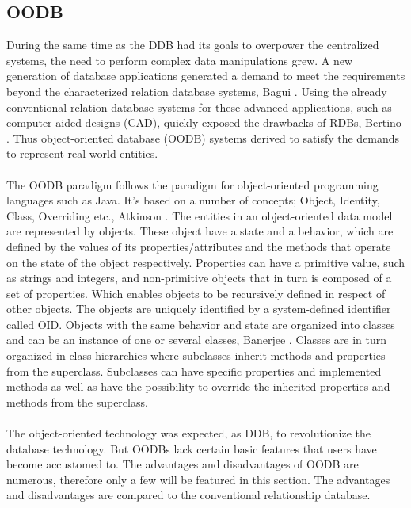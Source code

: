 \documentclass{cslthse-msc}
\begin{document}
\subsection{OODB}
During the same time as the DDB had its goals to overpower the centralized systems, the need to perform complex data manipulations grew. A new generation of database applications generated a demand to meet the requirements beyond the characterized relation database systems, Bagui \cite{OODBMS}. Using the already conventional relation database systems for these advanced applications, such as computer aided designs (CAD), quickly exposed the drawbacks of RDBs, Bertino \cite{OODBMSshortcomings}. Thus object-oriented database (OODB) systems derived to satisfy the demands to represent real world entities.\\\\
The OODB paradigm follows the paradigm for object-oriented programming languages such as Java. It's based on a number of concepts; Object, Identity, Class, Overriding etc., Atkinson \cite{OODBMSparadigms}. The entities in an object-oriented data model are represented by objects. These object have a state and a behavior, which are defined by the values of its properties/attributes and the methods that operate on the state of the object respectively. Properties can have a primitive value, such as strings and integers, and non-primitive objects that in turn is composed of a set of properties. Which enables objects to be recursively defined in respect of other objects. The objects are uniquely identified by a system-defined identifier called OID. Objects with the same behavior and state are organized into classes and can be an instance of one or several classes, Banerjee \cite{OODBMSclasses}. Classes are in turn organized in class hierarchies where subclasses inherit methods and properties from the superclass. Subclasses can have specific properties and implemented methods as well as have the possibility to override the inherited properties and methods from the superclass.\\\\
The object-oriented technology was expected, as DDB, to revolutionize the database technology. But OODBs lack certain basic features that users have become accustomed to. 
The advantages and disadvantages of OODB are numerous, therefore only a few will be featured in this section. The advantages and disadvantages are compared to the conventional relationship database.
\end{document}
